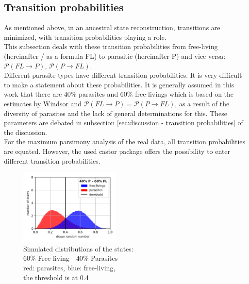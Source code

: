     \subsection{Transition probabilities}
      As mentioned above, in an ancestral state reconstruction, transitions are minimized, with 
        transition probabilities playing a role. \\
      This subsection deals with these transition probabilities from free-living (hereinafter / as a 
        formula FL) to parasitic (hereinafter P) and vice versa: $\mathcal{P}(FL \rightarrow P)$, 
        $\mathcal{P}(P \rightarrow FL)$. \\
      Different parasite types have different transition probabilities. It is very difficult to make a 
        statement about these probabilities. It is generally assumed in this work that there are 40\% 
        parasites and 60\% free-livings which is based on the estimates by Windsor \cite{Windsor1998} 
        and $\mathcal{P}(FL \rightarrow P) = \mathcal{P}(P \rightarrow FL)$, as a result of the 
        diversity of parasites and the lack of general determinations for this. These parameters are 
        debated in subsection \ref{sec:discussion - transition probabilities} of the discussion. \\

      For the maximum parsimony analysis of the real data, all transition probabilities are equated.
        However, the used castor package \cite{Louca2017} offers the possibility to enter different 
        transition probabilities.
      \begin{figure}
        \begin{center}
          \includegraphics[trim = 0mm 0mm 0mm 0mm, clip, width=0.45\textwidth]{Figures/40-60.png}
        \end{center}
        \caption{Simulated distributions of the states: \\
          60\% Free-living - 40\% Parasites \\
          red: parasites, blue: free-living, \\
          the threshold is at 0.4}
        \label{fig:Beta distribution}
      \end{figure}

